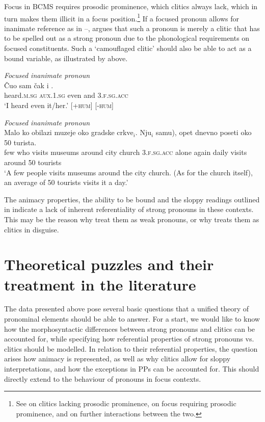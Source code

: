 \documentclass[output=paper,colorlinks,citecolor=brown]{langscibook}
\begin{document}
\noindent Focus in BCMS requires prosodic prominence, which clitics always lack, which in turn makes them illicit in a focus position.\footnote{See \citet{browne74,zecinkelas91,franksprogovac94,godjevac2000} on clitics lacking prosodic prominence, \citet{godjevac2000} on focus requiring prosodic prominence, and \citet[244]{despic11} on further interactions between the two.} If a focused pronoun allows for inanimate reference as in --, \citet[244]{despic11} argues that such a pronoun is merely a clitic that has to be spelled out as a strong pronoun due to the phonological requirements on focused constituents. Such a `camouflaged clitic' \citep[244]{despic11} should also be able to act as a bound variable, as illustrated by  above. 


\ea \label{focusexample} \textit{Focused inanimate pronoun}\\
\gll Čuo sam čak i . \\
heard.\textsc{m.sg} \textsc{aux.1.sg} even and \textsc{3.f.sg.acc}\\
\glt `I heard even it/her.' \hfill [+\textsc{hum}] [-\textsc{hum}] \citep[246]{despic11}
\z 

\newpage
\ea \label{intensifierexample} \textit{Focused inanimate pronoun}\\
\gll Malo ko obilazi muzeje oko gradske crkve$_{i}$. Nju$_{i}$ \minsp{*(} samu), opet dnevno poseti oko 50 turista.\\
few who visits museums around city church \textsc{3.f.sg.acc} {} alone again daily visits around 50 tourists\\
\glt `A few people visits museums around the city church. (As for the church itself), an average of 50 tourists visits it a day.'\hfill \citep[247]{despic11}
\z 

\noindent The animacy properties, the ability to be bound and the sloppy readings outlined in  indicate a lack of inherent referentiality of strong pronouns in these contexts. This may be the reason why \citet{cardinalettistarke} treat them as weak pronouns, or why \citet[244]{despic11} treats them as clitics in disguise. 

\section{Theoretical puzzles and their treatment in the literature}\label{pus:sec:previousaccounts}

The data presented above pose several basic questions that a unified theory of pronominal elements should be able to answer. For a start, we would like to know how the morphosyntactic differences between strong pronouns and clitics can be accounted for, while specifying how referential properties of strong pronouns vs. clitics should be modelled. In relation to their referential properties, the question arises how animacy is represented, as well as why clitics allow for sloppy interpretations, and how the exceptions in PPs can be accounted for. This should directly extend to the behaviour of pronouns in focus contexts. 
\end{document}
